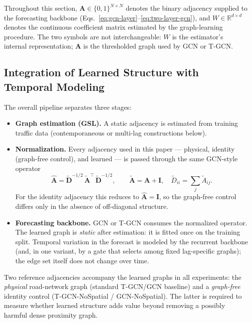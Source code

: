 Throughout this section, $\mathbf{A}\in\{0,1\}^{N\times N}$ denotes the
binary adjacency supplied to the forecasting backbone
(Eqs.~\eqref{eq:gcn-layer}--\eqref{eq:two-layer-gcn}), and
$W\in\mathbb{R}^{d\times d}$ denotes the continuous coefficient matrix
estimated by the graph-learning procedure. The two symbols are not
interchangeable: $W$ is the estimator's internal representation; $\mathbf{A}$
is the thresholded graph used by GCN or T-GCN.

\subsection{Integration of Learned Structure with Temporal Modeling}\label{sec:method-integration}

The overall pipeline separates three stages:
\begin{itemize}
\item \textbf{Graph estimation (GSL).} A static adjacency is estimated from
training traffic data (contemporaneous or multi-lag constructions below).
\item \textbf{Normalization.} Every adjacency used in this paper ---
physical, identity (graph-free control), and learned --- is passed through
the same GCN-style operator
\begin{equation}\label{eq:norm}
\hat{\mathbf{A}}
=\tilde{\mathbf{D}}^{-1/2}\,\tilde{\mathbf{A}}^{\top}\,\tilde{\mathbf{D}}^{-1/2},
\qquad
\tilde{\mathbf{A}}=\mathbf{A}+\mathbf{I},\quad
\tilde{D}_{ii}=\sum_j\tilde{A}_{ij}.
\end{equation}
For the identity adjacency this reduces to $\hat{\mathbf{A}}=\mathbf{I}$, so
the graph-free control differs only in the absence of off-diagonal structure.
\item \textbf{Forecasting backbone.} GCN or T-GCN consumes the normalized
operator. The learned graph is \emph{static} after estimation: it is fitted
once on the training split. Temporal variation in the forecast is modeled by
the recurrent backbone (and, in one variant, by a gate that selects among
fixed lag-specific graphs); the edge set itself does not change over time.
\end{itemize}

Two reference adjacencies accompany the learned graphs in all experiments:
the \emph{physical} road-network graph (standard T-GCN/GCN baseline) and a
\emph{graph-free} identity control (T-GCN-NoSpatial / GCN-NoSpatial). The
latter is required to measure whether learned structure adds value beyond
removing a possibly harmful dense proximity graph.

